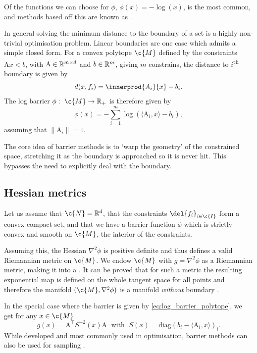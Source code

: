Of the functions we can choose for \(\phi\), \(\phi(x) = -\log(x)\), is the most common, and methods based off this are known as  \cite{lee2017Geodesic}.

In general solving the minimum distance to the boundary of a set is a highly non-trivial optimisation problem.
Linear boundaries are one case which admits a simple closed form.
For a convex polytope \(\c{M}\) defined by the constraints \(\mathrm{A} x < b\), with \(\mathrm{A} \in \mathbb{R}^{m \times d}\) and \(b \in \mathbb{R}^m\), giving \(m\) constrains, the distance to \(i\)\textsuperscript{th} boundary is given by
\[d(x, f_i) = \innerprod{A_i}{x} - b_i.\]
The log barrier \(\phi: \ \c{M} \to \R_+\) is therefore given by \begin{equation} \label{eq:log_barrier_polytope} { \phi(x) = - \sum_{i=1}^m \log(\langle \mathrm{A}_i, x\rangle-b_i),
	}
\end{equation}
assuming that \(\| \mathrm{A}_i \| =1\).

The core idea of barrier methods is to `warp the geometry' of the constrained space, stretching it as the boundary is approached so it is never hit.
This bypasses the need to explicitly deal with the boundary.

\subsection{Hessian metrics}

Let us assume that \(\c{N} = \R^d\), that the constraints \(\del{f_i}_{i\in\c{I}}\) form a convex compact set, and that we have a barrier function \(\phi\) which is strictly convex and smooth on \(\c{M}\), the interior of the constraints.

Assuming this, the Hessian \(\nabla^2 \phi\) is positive definite and thus defines a valid Riemannian metric on \(\c{M}\).
We endow \(\c{M}\) with \(g = \nabla^2 \phi\) as a Riemannian metric, making it into a  \cite{shima1997geometry}.
It can be proved that for such a metric the resulting exponential map is defined on the whole tangent space for all points and therefore the manifold \((\c{M}, \nabla^2 \phi)\) is a manifold \emph{without} boundary \cite{lee2017Geodesic}.

In the special case where the barrier is given by \cref{eq:log_barrier_polytope}, we get for any \(x \in \c{M}\) 
\[ {g}(x) = \mathrm{A}^\top S^{-2}(x) \mathrm{A} \;\text{ with }\; S(x) = \text{diag}(b_i - \langle \mathrm{A}_i, x \rangle)_i. \]
While developed and most commonly used in optimisation, barrier methods can also be used for sampling \parencite{lee2017Geodesic}.

